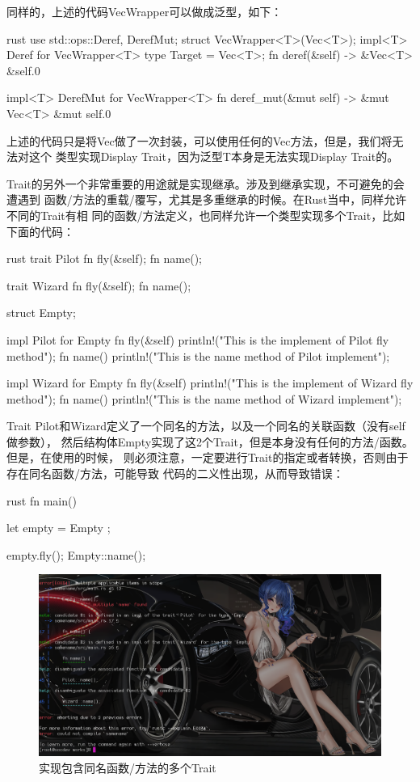 同样的，上述的代码VecWrapper可以做成泛型，如下：
\begin{code-block}{rust}
use std::ops::{Deref, DerefMut};
struct VecWrapper<T>(Vec<T>);
impl<T> Deref for VecWrapper<T> {
    type Target = Vec<T>;
    fn deref(&self) -> &Vec<T> {
        &self.0
    }
}

impl<T> DerefMut for VecWrapper<T> {
    fn deref_mut(&mut self) -> &mut Vec<T> {
        &mut self.0
    }
}
\end{code-block}
上述的代码只是将Vec做了一次封装，可以使用任何的Vec方法，但是，我们将无法对这个
类型实现Display Trait，因为泛型T本身是无法实现Display Trait的。

Trait的另外一个非常重要的用途就是实现继承。涉及到继承实现，不可避免的会遭遇到
函数/方法的重载/覆写，尤其是多重继承的时候。在Rust当中，同样允许不同的Trait有相
同的函数/方法定义，也同样允许一个类型实现多个Trait，比如下面的代码：
\begin{code-block}{rust}
trait Pilot {
    fn fly(&self);
    fn name();
}

trait Wizard {
    fn fly(&self);
    fn name();
}

struct Empty;

impl Pilot for Empty {
    fn fly(&self) {
        println!("This is the implement of Pilot fly method");
    }
    fn name() {
        println!("This is the name method of Pilot implement");
    }
}

impl Wizard for Empty {
    fn fly(&self) {
        println!("This is the implement of Wizard fly method");
    }
    fn name() {
        println!("This is the name method of Wizard implement");
    }
}
\end{code-block}
Trait Pilot和Wizard定义了一个同名的方法，以及一个同名的关联函数（没有self做参数），
然后结构体Empty实现了这2个Trait，但是本身没有任何的方法/函数。但是，在使用的时候，
则必须注意，一定要进行Trait的指定或者转换，否则由于存在同名函数/方法，可能导致
代码的二义性出现，从而导致错误：
\begin{code-block}{rust}
fn main() {
    let empty = Empty {};

    empty.fly();
    Empty::name();
}
\end{code-block}
\begin{figure}[H]
  \centering
  \includegraphics[width=\linewidth]{rust_same_name.png}
  \caption{实现包含同名函数/方法的多个Trait}
  \label{fig:rust_same_name}
\end{figure}
